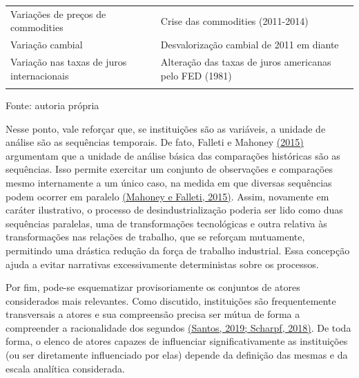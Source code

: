 \begin{longtable}[]{@{}
  >{\raggedright\arraybackslash}p{}
  >{\raggedright\arraybackslash}p{}@{}}
\begin{minipage}[b]{\linewidth}
Variações de preços de commodities
\end{minipage} & \begin{minipage}[b]{\linewidth}\raggedright
Crise das commodities (2011-2014)
\end{minipage} \\
\begin{minipage}[b]{\linewidth}\raggedright
Variação cambial
\end{minipage} & \begin{minipage}[b]{\linewidth}\raggedright
Desvalorização cambial de 2011 em diante
\end{minipage} \\
\begin{minipage}[b]{\linewidth}\raggedright
Variação nas taxas de juros internacionais
\end{minipage} & \begin{minipage}[b]{\linewidth}\raggedright
Alteração das taxas de juros americanas pelo FED (1981)
\end{minipage} \\
\midrule\noalign{}
\endhead
\bottomrule\noalign{}
\endlastfoot
\end{longtable}

Fonte: autoria própria

Nesse ponto, vale reforçar que, se instituições são as variáveis, a
unidade de análise são as sequências temporais. De fato, Falleti e
Mahoney \href{https://www.zotero.org/google-docs/?jFJxqc}{(2015)}
argumentam que a unidade de análise básica das comparações históricas
são as sequências. Isso permite exercitar um conjunto de observações e
comparações mesmo internamente a um único caso, na medida em que
diversas sequências podem ocorrer em paralelo
\href{https://www.zotero.org/google-docs/?E4YTAR}{(Mahoney e Falleti,
2015)}. Assim, novamente em caráter ilustrativo, o processo de
desindustrialização poderia ser lido como duas sequências paralelas, uma
de transformações tecnológicas e outra relativa às transformações nas
relações de trabalho, que se reforçam mutuamente, permitindo uma
drástica redução da força de trabalho industrial. Essa concepção ajuda a
evitar narrativas excessivamente deterministas sobre os processos.

Por fim, pode-se esquematizar provisoriamente os conjuntos de atores
considerados mais relevantes. Como discutido, instituições são
frequentemente transversais a atores e sua compreensão precisa ser mútua
de forma a compreender a racionalidade dos segundos
\href{https://www.zotero.org/google-docs/?8IHgKx}{(Santos, 2019;
Scharpf, 2018)}. De toda forma, o elenco de atores capazes de
influenciar significativamente as instituições (ou ser diretamente
influenciado por elas) depende da definição das mesmas e da escala
analítica considerada.

